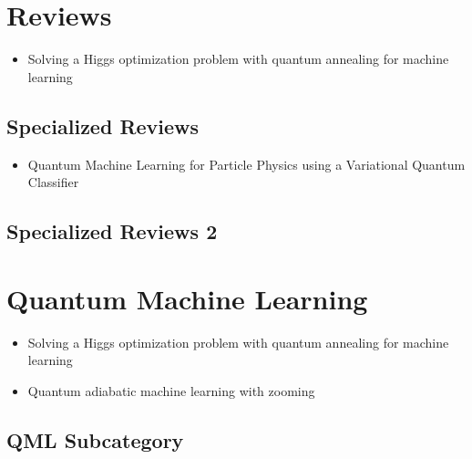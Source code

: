 \section{Reviews}

\begin{itemize}
   \item Solving a Higgs optimization problem with quantum annealing for machine learning~\cite{Mott:2017xdb}
\end{itemize}


\subsection{Specialized Reviews}

\begin{itemize}
   \item Quantum Machine Learning for Particle Physics using a Variational Quantum Classifier~\cite{Blance:2020nhl}
\end{itemize}


\subsection{Specialized Reviews 2}



\section{Quantum Machine Learning}

\begin{itemize}
   \item Solving a Higgs optimization problem with quantum annealing for machine learning~\cite{Mott:2017xdb}
   \item Quantum adiabatic machine learning with zooming~\cite{Zlokapa:2019lvv}
\end{itemize}


\subsection{QML Subcategory}



